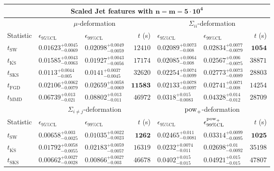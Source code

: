 \begin{tabular}{l|llr|llr}
	\toprule
	\multicolumn{7}{c}{{\bf Scaled Jet features with $\mathbf{n=m=5\cdot 10^{4}}$}} \\
	\toprule
	\multicolumn{1}{c}{} & \multicolumn{3}{c}{$\mu$-deformation} & \multicolumn{3}{c}{$\Sigma_{ii}$-deformation} \\
	Statistic & $\epsilon_{95\%\mathrm{CL}}$ & $\epsilon_{99\%\mathrm    {CL}}$ & $t$ (s) & $\epsilon_{95\%\mathrm{CL}}$ & $\epsilon_{99\%\mathrm{CL}}$ & $t$ (s) \\
	\midrule
	$t_{\mathrm{SW}}$ & $0.01623_{-0.0069}^{+0.0045}$ & $0.02098_{-0.0059}^{+0.0049}$ & $12410$ & $0.02089_{-0.008}^{+0.0073}$ & $0.02834_{-0.0079}^{+0.0077}$ & ${\mathbf{1054}}$ \\
	$t_{\overline{\mathrm{KS}}}$ & $0.01585_{-0.0063}^{+0.0043}$ & $0.01927_{-0.0056}^{+0.0043}$ & $17174$ & ${\mathbf{0.02085_{-0.008}^{+0.0064}}}$ & ${\mathbf{0.02567_{-0.0075}^{+0.006}}}$ & $38871$ \\
	$t_{\mathrm{SKS}}$ & ${\mathbf{0.0113_{-0.005}^{+0.0044}}}$ & ${\mathbf{0.0141_{-0.0045}^{+0.0037}}}$ & $32620$ & $0.02254_{-0.0099}^{+0.0074}$ & $0.02773_{-0.0089}^{+0.0073}$ & $28803$ \\
	$t_{\mathrm{FGD}}$ & $0.02106_{-0.0079}^{+0.0062}$ & $0.02659_{-0.0069}^{+0.0058}$ & ${\mathbf{11583}}$ & $0.02133_{-0.0097}^{+0.0078}$ & $0.02741_{-0.008}^{+0.0071}$ & $14254$ \\
	$t_{\mathrm{MMD}}$ & $0.06739_{-0.021}^{+0.013}$ & $0.08802_{-0.011}^{+0.013}$ & $46972$ & $0.0318_{-0.0083}^{+0.015}$ & $0.04328_{-0.012}^{+0.014}$ & $28709$ \\
	\toprule
	\multicolumn{1}{c}{} & \multicolumn{3}{c}{$\Sigma_{i\neq j}$-deformation} & \multicolumn{3}{c}{$\rm{pow}_{+}$-deformation} \\
	Statistic & $\epsilon_{95\%\mathrm{CL}}$ & $\epsilon_{99\%\mathrm{CL}}$ & $t$ (s) & $\epsilon_{95\%\mathrm{CL}}$ & $\epsilon^{\rm   {pow}_{+}}_{99\%\mathrm{CL}}$ & $t$ (s) \\
	\midrule
	$t_{\mathrm{SW}}$ & $0.00658_{-0.0025}^{+0.003}$ & $0.01035_{-0.0023}^{+0.0022}$ & ${\mathbf{1262}}$ & $0.02465_{-0.0081}^{+0.011}$ & $0.03314_{-0.0095}^{+0.0099}$ & ${\mathbf{1025}}$ \\
	$t_{\overline{\mathrm{KS}}}$ & $0.01792_{-0.0055}^{+0.0058}$ & $0.02183_{-0.0057}^{+0.0059}$ & $16319$ & $0.0232_{-0.011}^{+0.0074}$ & $0.02698_{-0.0092}^{+0.01}$ & $35198$ \\
	$t_{\mathrm{SKS}}$ & $0.00662_{-0.0028}^{+0.0027}$ & $0.00866_{-0.003}^{+0.0027}$ & $46678$ & $0.0402_{-0.015}^{+0.015}$ & $0.04921_{-0.015}^{+0.015}$ & $47807$ \\

\end{tabular}
